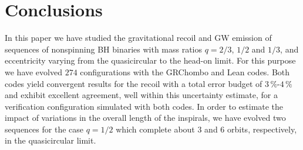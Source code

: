 \documentclass[floats,floatfix,showpacs,amssymb,prd,twocolumn,superscriptaddress,nofootinbib,nolongbibliography,reprint]{revtex4-2}
\begin{document}
\section{Conclusions}
\label{sec:concl}
%
In this paper we have studied the gravitational recoil and GW emission
of sequences of nonspinning BH binaries with mass ratios $q=2/3$,
$1/2$ and $1/3$,
and eccentricity varying from the quasicircular to the head-on limit.
For this purpose we have evolved $274$ configurations
with the {\sc GRChombo} and {\sc Lean} codes. Both codes yield
convergent results for the recoil with a total error budget of
$3\,\%$-$4\,\%$ and exhibit excellent agreement, well within this uncertainty
estimate, for a verification configuration simulated with both codes.
In order to estimate the impact of variations in the overall length
of the inspirals, we have evolved two sequences for the case $q=1/2$ which
complete about 3 and 6 orbits, respectively, in the quasicircular limit.
\end{document}
